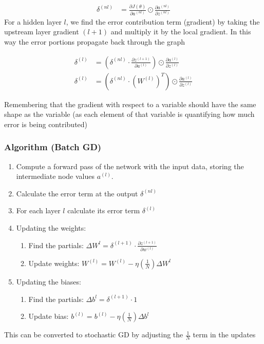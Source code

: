 \documentclass[]{article}
\begin{document}
				\begin{align}
					\delta^{(nl)} &= \frac{\partial J(\theta)}{\partial a^{(nl)}}  \odot \frac{\partial a^{(nl)}} {\partial z^{(nl)} }
				\end{align}
				\newpage
				\textnormal{For a hidden layer $l$, we find the error contribution term (gradient) by taking the upstream layer gradient $(l+1)$ and multiply it by the  local gradient. In this way the error portions propagate back through the graph}
				
				\begin{align}
					\delta^{(l)} &= (\delta^{(nl)} \cdot \frac{\partial z^{(l+1)}} {\partial a^{(l)} }) \odot \frac{\partial a^{(l)}} {\partial z^{(l)} }\\
					\delta^{(l)} &= ( \delta^{(nl)} \cdot (W^{(l)})^T ) \odot \frac{\partial a^{(l)}} {\partial z^{(l)} } 
				\end{align}
				
				\textnormal{Remembering that the gradient with respect to a variable should have the same shape as the variable (as each element of that variable is quantifying how much error is being contributed)}
			
			\subsubsection{Algorithm (Batch GD)}
				\begin{enumerate}
					\item Compute a forward pass of the network with the input data, storing the intermediate node values $a^{(l)}$.
					\item Calculate the error term at the output $\delta^{(nl)}$
					\item For each layer $l$ calculate its error term $\delta^{(l)}$
					\item Updating the weights:
						\begin{enumerate}
							\item Find the partials: $\Delta W^{l} = \delta^{(l+1)} \cdot \frac{\partial z^{(l+1)}} {\partial w^{(l)} }$
							\item Update weights: $W^{(l)} = W^{(l)} - \eta (\frac{1}{N}) \Delta W^{l}$
						\end{enumerate}
					\item Updating the biases:
						\begin{enumerate}
							\item Find the partials: $\Delta b^{l} = \delta^{(l+1)} \cdot 1$
							\item Update bias: $b^{(l)} = b^{(l)} - \eta (\frac{1}{N}) \Delta b^{l}$
						\end{enumerate}
				\end{enumerate}
				\textnormal{This can be converted to stochastic GD by adjusting the $\frac{1}{N}$ term in the updates}
				
			
\end{document}
